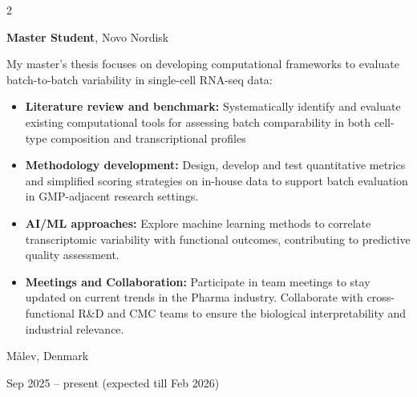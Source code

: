 \documentclass[10pt, letterpaper]{article}
\newenvironment{highlights}{
    \begin{itemize}[
        topsep=0.10 cm,
        parsep=0.10 cm,
        partopsep=0pt,
        itemsep=0pt,
        leftmargin=0.4 cm + 10pt
    ]
}{
    \end{itemize}
} %
\newenvironment{twocolentry}[2][]{
    \onecolentry
    \def\secondColumn{#2}
    \setcolumnwidth{\fill, 4.5 cm}
    \begin{paracol}{2}
}{
    \switchcolumn \raggedleft \secondColumn
    \end{paracol}
    \endonecolentry
} %
\begin{document}
        \begin{twocolentry}{
    Målev, Denmark

    Sep 2025 – present (expected till Feb 2026)
}
    \textbf{Master Student}, Novo Nordisk

    \vspace{0.1cm}
    
     My master’s thesis focuses on developing computational frameworks to evaluate batch-to-batch variability in single-cell RNA-seq data:

    \begin{highlights}
        \item \textbf{Literature review and benchmark:} Systematically identify and evaluate existing computational tools for assessing batch comparability in both cell-type composition and transcriptional profiles

        \vspace{0.1cm}

        \item \textbf{Methodology development:} Design, develop and test quantitative metrics and simplified scoring strategies on in-house data to support batch evaluation in GMP-adjacent research settings.

        \vspace{0.1cm}

        \item \textbf{AI/ML approaches:} Explore machine learning methods to correlate transcriptomic variability with functional outcomes, contributing to predictive quality assessment.

        \vspace{0.1cm}

        \item \textbf{Meetings and Collaboration:} Participate in team meetings to stay updated on current trends in the Pharma industry. Collaborate with cross-functional R\&D and CMC teams to ensure the biological interpretability and industrial relevance.
    \end{highlights}
\end{twocolentry}


        \vspace{0.3 cm}
\end{document}
